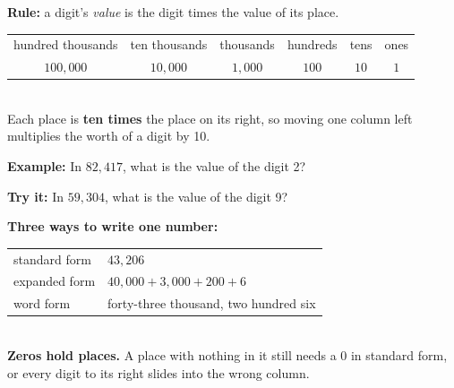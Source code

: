 \documentclass[12pt]{article}
\begin{document}


\begin{formulabox}
\textbf{Rule:} a digit's \emph{value} is the digit times the value of its place.\\[3pt]
\begin{tabular}{@{}cccccc@{}}
hundred thousands & ten thousands & thousands & hundreds & tens & ones\\
$100{,}000$ & $10{,}000$ & $1{,}000$ & $100$ & $10$ & $1$
\end{tabular}\\[3pt]
Each place is \textbf{ten times} the place on its right, so moving one column left multiplies
the worth of a digit by 10.
\end{formulabox}

\begin{examplebox}
\textbf{Example:} \quad In $82{,}417$, what is the value of the digit 2?
\end{examplebox}

\begin{tryitbox}
\textbf{Try it:} \quad In $59{,}304$, what is the value of the digit 9?\\[2pt]
\end{tryitbox}


\begin{formulabox}
\textbf{Three ways to write one number:}\\[3pt]
\begin{tabular}{@{}ll@{}}
standard form & $43{,}206$\\
expanded form & $40{,}000 + 3{,}000 + 200 + 6$\\
word form & forty-three thousand, two hundred six
\end{tabular}\\[3pt]
\textbf{Zeros hold places.} A place with nothing in it still needs a 0 in standard form, or
every digit to its right slides into the wrong column.
\end{formulabox}
\end{document}
